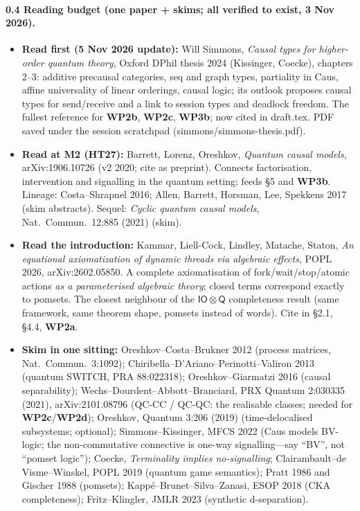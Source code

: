\documentclass[11pt,a4paper]{article}
\newcommand{\WP}[1]{\textbf{WP#1}}
\newcommand{\iotq}{\mathsf{IO}\otimes\mathsf{Q}}   %
\begin{document}
\paragraph{0.4 Reading budget (one paper + skims; all verified to exist, 3 Nov 2026).}
\begin{itemize}[nosep]
\item \textbf{Read first (5 Nov 2026 update):} Will Simmons, \emph{Causal types for higher-order quantum theory}, Oxford DPhil thesis 2024 (Kissinger, Coecke), chapters 2--3: additive precausal categories, seq and graph types, partiality in Caus, affine universality of linear orderings, causal logic; its outlook proposes causal types for send/receive and a link to session types and deadlock freedom. The fullest reference for \WP{2b}, \WP{2c}, \WP{3b}; now cited in draft.tex. PDF saved under the session scratchpad (simmons/simmons-thesis.pdf).\n\item \textbf{Read at M2 (HT27):} Barrett, Lorenz, Oreshkov, \emph{Quantum causal models}, arXiv:1906.10726 (v2 2020; cite as preprint). Connects factorisation, intervention and signalling in the quantum setting; feeds \S5 and \WP{3b}. Lineage: Costa--Shrapnel 2016; Allen, Barrett, Horsman, Lee, Spekkens 2017 (skim abstracts). Sequel: \emph{Cyclic quantum causal models}, Nat.\ Commun.\ 12:885 (2021) (skim).
\item \textbf{Read the introduction:} Kammar, Liell-Cock, Lindley, Matache, Staton, \emph{An equational axiomatization of dynamic threads via algebraic effects}, POPL 2026, arXiv:2602.05850. A complete axiomatisation of fork/wait/stop/atomic actions \emph{as a parameterised algebraic theory}; closed terms correspond exactly to pomsets. The closest neighbour of the $\iotq$ completeness result (same framework, same theorem shape, pomsets instead of words). Cite in \S2.1, \S4.4, \WP{2a}.
\item \textbf{Skim in one sitting:} Oreshkov--Costa--Brukner 2012 (process matrices, Nat.\ Commun.\ 3:1092); Chiribella--D'Ariano--Perinotti--Valiron 2013 (quantum SWITCH, PRA 88:022318); Oreshkov--Giarmatzi 2016 (causal separability); Wechs--Dourdent--Abbott--Branciard, PRX Quantum 2:030335 (2021), arXiv:2101.08796 (QC-CC / QC-QC: the realisable classes; needed for \WP{2c}/\WP{2d}); Oreshkov, Quantum 3:206 (2019) (time-delocalised subsystems; optional); Simmons--Kissinger, MFCS 2022 (Caus models BV-logic; the non-commutative connective is one-way signalling---say ``BV'', not ``pomset logic''); Coecke, \emph{Terminality implies no-signalling}; Clairambault--de Visme--Winskel, POPL 2019 (quantum game semantics); Pratt 1986 and Gischer 1988 (pomsets); Kapp\'e--Brunet--Silva--Zanasi, ESOP 2018 (CKA completeness); Fritz--Klingler, JMLR 2023 (synthetic d-separation).
\end{itemize}
\end{document}
